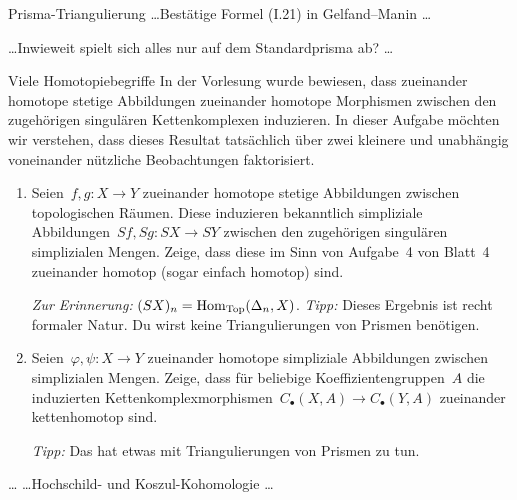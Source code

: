 \documentclass{uebblatt}
\begin{document}

\begin{aufgabe}{Prisma-Triangulierung}
\ldots Bestätige Formel (I.21) in Gelfand--Manin \ldots

\ldots Inwieweit spielt sich alles nur auf dem Standardprisma ab? \ldots
\end{aufgabe}

\begin{aufgabe}{Viele Homotopiebegriffe}
In der Vorlesung wurde bewiesen, dass zueinander homotope stetige Abbildungen
zueinander homotope Morphismen zwischen den zugehörigen singulären
Kettenkomplexen induzieren. In dieser Aufgabe möchten wir verstehen, dass
dieses Resultat tatsächlich über zwei kleinere und unabhängig voneinander
nützliche Beobachtungen faktorisiert.
\begin{enumerate}
\item Seien~$f, g : X \to Y$ zueinander homotope stetige Abbildungen zwischen
topologischen Räumen. Diese induzieren bekanntlich simpliziale Abbildungen~$Sf,
Sg : SX \to SY$ zwischen den zugehörigen singulären simplizialen Mengen. Zeige,
dass diese im Sinn von Aufgabe~4 von Blatt~4 zueinander homotop (sogar einfach
homotop) sind.

\emph{Zur Erinnerung:} $(SX)_n = \mathrm{Hom}_{\mathrm{Top}}(\Delta_n,X)$.
\emph{Tipp:} Dieses Ergebnis ist recht formaler Natur. Du wirst keine
Triangulierungen von Prismen benötigen.

\item Seien~$\varphi, \psi : X \to Y$ zueinander homotope simpliziale
Abbildungen zwischen simplizialen Mengen. Zeige, dass für beliebige
Koeffizientengruppen~$A$ die induzierten
Kettenkomplexmorphismen~$C_\bullet(X,A) \to C_\bullet(Y,A)$ zueinander
kettenhomotop sind.

\emph{Tipp:} Das hat etwas mit Triangulierungen von Prismen zu tun.
\end{enumerate}
\end{aufgabe}

\begin{aufgabe}{\ldots}
\ldots Hochschild- und Koszul-Kohomologie \ldots
\end{aufgabe}
\end{document}
